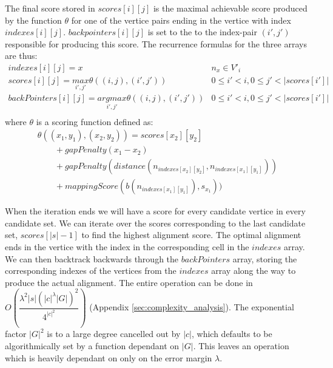 \documentclass[thesis.tex]{subfiles}
\begin{document}
\par\noindent
The final score stored in $scores[i][j]$ is the maximal achievable score produced by the function $\theta$ for one of the vertice pairs ending in the vertice with index $indexes[i][j]$. $backpointers[i][j]$ is set to the to the index-pair $(i', j')$ responsible for producing this score. The recurrence formulas for the three arrays are thus:\\
\begin{equation}
  \begin{array}{ll}
    indexes[i][j] = x & n_x \in V'_i\\
    scores[i][j] = \underset{i', j'}{max} \theta((i, j), (i', j')) & 0 \leq i' < i, 0 \leq j' < |scores[i']|\\
    backPointers[i][j] = \underset{i', j'}{argmax} \theta((i, j), (i', j')) & 0 \leq i' < i, 0 \leq j' < |scores[i']|\\
  \end{array}
\end{equation}
where $\theta$ is a scoring function defined as:\\
\begin{equation}
  \begin{array}{l}
    \theta((x_1, y_1), (x_2, y_2))=scores[x_2][y_2] \\\quad\quad + gapPenalty(x_1-x_2) \\\quad\quad + gapPenalty(distance(n_{indexes[x_2][y_2]}, n_{indexes[x_1][y_1]})) \\\quad\quad + mappingScore(b(n_{indexes[x_1][y_1]}), s_{x_1}))
  \end{array}
\end{equation}
\par\noindent
When the iteration ends we will have a score for every candidate vertice in every candidate set. We can iterate over the scores corresponding to the last candidate set, $scores[|s|-1]$ to find the highest alignment score. The optimal alignment ends in the vertice with the index in the corresponding cell in the $indexes$ array. We can then backtrack backwards through the $backPointers$ array, storing the corresponding indexes of the vertices from the $indexes$ array along the way to produce the actual alignment. The entire operation can be done in $O(\dfrac{\lambda^2|s|(|c|^{\lambda}|G|)^2}{4^{|c|^2}})$ (Appendix \ref{sec:complexity_analysis}). The exponential factor $|G|^2$ is to a large degree cancelled out by $|c|$, which defaults to be algorithmically set by a function dependant on $|G|$. This leaves an operation which is heavily dependant on only on the error margin $\lambda$.
\end{document}
